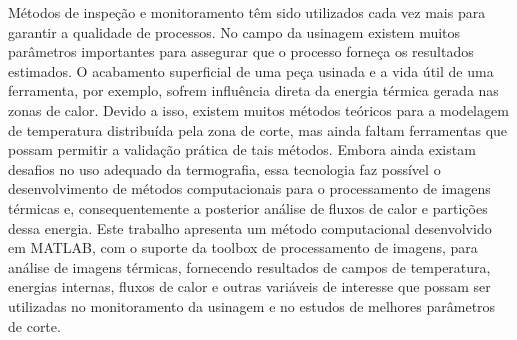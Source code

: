 	M{\'e}todos de inspe\c{c}{\~a}o e monitoramento t{\^e}m sido utilizados cada vez mais para garantir a qualidade de processos. No campo da usinagem existem muitos par\^ametros importantes para assegurar que o processo forne\c{c}a os resultados estimados. O acabamento superficial de uma pe\c{c}a usinada e a vida \'util de uma ferramenta, por exemplo, sofrem influ\^encia direta da energia t\'ermica gerada nas zonas de calor. Devido a isso, existem muitos m\'etodos te\'oricos para a modelagem de temperatura distribu\'ida pela zona de corte, mas ainda faltam ferramentas que possam permitir a valida\c{c}{\~a}o pr\'atica de tais m\'etodos. Embora ainda existam desafios no uso adequado da termografia, essa tecnologia faz poss\'ivel o desenvolvimento de m\'etodos computacionais para o processamento de imagens t\'ermicas e, consequentemente a posterior an\'alise de fluxos de calor e parti\c{c}{\~o}es dessa energia.
	Este trabalho apresenta um m\'etodo computacional desenvolvido em MATLAB, com o suporte da toolbox de processamento de imagens, para an\'alise de imagens t\'ermicas, fornecendo resultados de campos de temperatura, energias internas, fluxos de calor e outras vari\'aveis de interesse que possam ser utilizadas no monitoramento da usinagem e no estudos de melhores par\^ametros de corte.